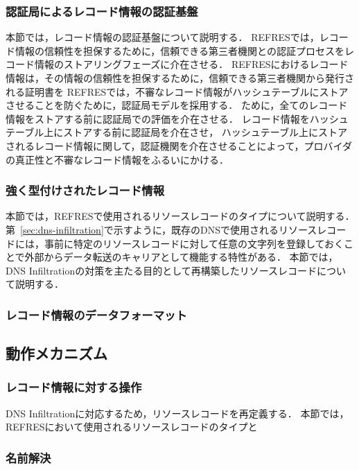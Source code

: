 
\subsubsection{認証局によるレコード情報の認証基盤}
本節では，レコード情報の認証基盤について説明する．
REFRESでは，レコード情報の信頼性を担保するために，信頼できる第三者機関との認証プロセスをレコード情報のストアリングフェーズに介在させる．
REFRESにおけるレコード情報は，その情報の信頼性を担保するために，信頼できる第三者機関から発行される証明書を
REFRESでは，不審なレコード情報がハッシュテーブルにストアさせることを防ぐために，認証局モデルを採用する．
ために，全てのレコード情報をストアする前に認証局での評価を介在させる．
レコード情報をハッシュテーブル上にストアする前に認証局を介在させ，
ハッシュテーブル上にストアされるレコード情報に関して，認証機関を介在させることによって，プロバイダの真正性と不審なレコード情報をふるいにかける．

\subsubsection{強く型付けされたレコード情報}
本節では，REFRESで使用されるリソースレコードのタイプについて説明する．
第~\ref{sec:dns-infiltration}で示すように，既存のDNSで使用されるリソースレコードには，事前に特定のリソースレコードに対して任意の文字列を登録しておくことで外部からデータ転送のキャリアとして機能する特性がある．
本節では，DNS Infiltrationの対策を主たる目的として再構築したリソースレコードについて説明する．




\subsubsection{レコード情報のデータフォーマット}

\subsection{動作メカニズム}
\subsubsection{レコード情報に対する操作}
DNS Infiltrationに対応するため，リソースレコードを再定義する．
本節では，REFRESにおいて使用されるリソースレコードのタイプと

\subsubsection{名前解決}
